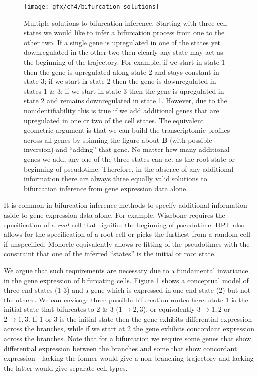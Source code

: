 \begin{figure}[!t]
	\centering
	\texttt{[image: gfx/ch4/bifurcation\_solutions]}
	\caption{Multiple solutions to bifurcation inference.
{\normalfont
Starting with three cell states we would like to infer a bifurcation process from one to the other two. If a single gene is upregulated in one of the states yet downregulated in the other two then clearly any state may act as the beginning of the trajectory. For example, if we start in state 1 then the gene is upregulated along state 2 and stays constant in state 3; if we start in state 2 then the gene is downregulated in states 1 \& 3; if we start in state 3 then the gene is upregulated in state 2 and remains downregulated in state 1.  However, due to the nonidentifiability this is true if we add additional genes that are upregulated in one or two of the cell states. The equivalent geometric argument is that we can build the transcriptomic profiles across all genes by spinning the figure about \textbf{B} (with possible inversion) and ``adding'' that gene. No matter how many additional genes we add, any one of the three states can act as the root state or beginning of pseudotime. Therefore, in the absence of any additional information there are always three equally valid solutions to bifurcation inference from gene expression data alone.
}
	} \label{fig:multisol}
\end{figure}

It is common in bifurcation inference methods to specify additional information aside to gene expression data alone.
For example, Wishbone requires the specification of a \emph{root} cell that signifies the beginning of pseudotime. %
DPT also allows for the specification of a root cell or picks the furthest from a random cell if unspecified.
Monocle equivalently allows re-fitting of the pseudotimes with the constraint that one of the inferred ``states'' is the initial or root state.

We argue that such requirements are necessary due to a fundamental invariance in the gene expression of bifurcating cells. Figure \ref{fig:multisol} shows a conceptual model of three end-states (1-3) and a  gene which is expressed in one end state (2) but not the others. We can envisage three possible bifurcation routes here: state 1 is the initial state that bifurcates to 2 \& 3 ($1 \rightarrow 2,3$), or equivalently $3 \rightarrow 1,2$ or $2 \rightarrow 1,3$. If 1 or 3 is the initial state then the gene exhibits differential expression across the branches, while if we start at 2 the gene exhibits concordant expression across the branches. Note that for a bifurcation we require some genes that show differential expression between the branches and some that show concordant expression - lacking the former would give a non-branching trajectory and lacking the latter would give separate cell types.

